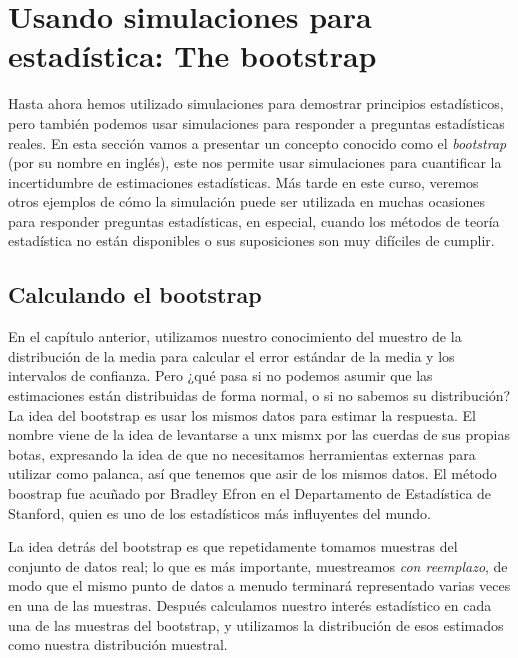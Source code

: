 \documentclass[
  12pt,
]{book}
\begin{document}
\hypertarget{usando-simulaciones-para-estaduxedstica-the-bootstrap}{%
\section{Usando simulaciones para estadística: The bootstrap}\label{usando-simulaciones-para-estaduxedstica-the-bootstrap}}

Hasta ahora hemos utilizado simulaciones para demostrar principios estadísticos, pero también podemos usar simulaciones para responder a preguntas estadísticas reales. En esta sección vamos a presentar un concepto conocido como el \emph{bootstrap} (por su nombre en inglés), este nos permite usar simulaciones para cuantificar la incertidumbre de estimaciones estadísticas. Más tarde en este curso, veremos otros ejemplos de cómo la simulación puede ser utilizada en muchas ocasiones para responder preguntas estadísticas, en especial, cuando los métodos de teoría estadística no están disponibles o sus suposiciones son muy difíciles de cumplir.

\hypertarget{calculando-el-bootstrap}{%
\subsection{Calculando el bootstrap}\label{calculando-el-bootstrap}}

En el capítulo anterior, utilizamos nuestro conocimiento del muestro de la distribución de la media para calcular el error estándar de la media y los intervalos de confianza. Pero ¿qué pasa si no podemos asumir que las estimaciones están distribuidas de forma normal, o si no sabemos su distribución? La idea del bootstrap es usar los mismos datos para estimar la respuesta. El nombre viene de la idea de levantarse a unx mismx por las cuerdas de sus propias botas, expresando la idea de que no necesitamos herramientas externas para utilizar como palanca, así que tenemos que asir de los mismos datos. El método boostrap fue acuñado por Bradley Efron en el Departamento de Estadística de Stanford, quien es uno de los estadísticos más influyentes del mundo.

La idea detrás del bootstrap es que repetidamente tomamos muestras del conjunto de datos real; lo que es más importante, muestreamos \emph{con reemplazo}, de modo que el mismo punto de datos a menudo terminará representado varias veces en una de las muestras. Después calculamos nuestro interés estadístico en cada una de las muestras del bootstrap, y utilizamos la distribución de esos estimados como nuestra distribución muestral.
\end{document}
